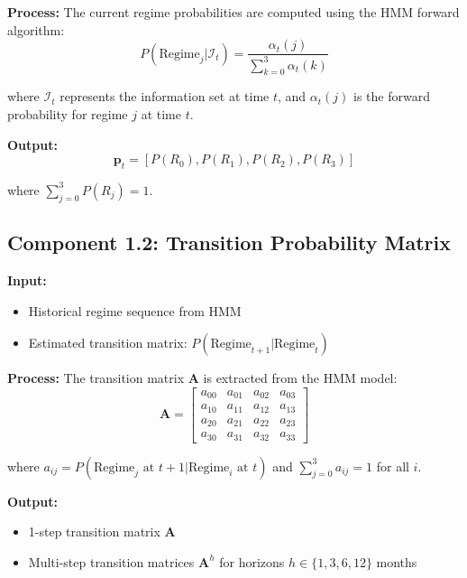 \documentclass[11pt,a4paper]{article}
\begin{document}
\textbf{Process:}
The current regime probabilities are computed using the HMM forward algorithm:
\begin{equation}
    P(\text{Regime}_j | \mathcal{I}_t) = \frac{\alpha_t(j)}{\sum_{k=0}^{3} \alpha_t(k)}
\end{equation}

where $\mathcal{I}_t$ represents the information set at time $t$, and $\alpha_t(j)$ is the forward probability for regime $j$ at time $t$.

\textbf{Output:}
\begin{equation}
    \mathbf{p}_t = [P(R_0), P(R_1), P(R_2), P(R_3)]
\end{equation}

where $\sum_{j=0}^{3} P(R_j) = 1$.

\subsection{Component 1.2: Transition Probability Matrix}

\textbf{Input:}
\begin{itemize}
    \item Historical regime sequence from HMM
    \item Estimated transition matrix: $P(\text{Regime}_{t+1} | \text{Regime}_t)$
\end{itemize}

\textbf{Process:}
The transition matrix $\mathbf{A}$ is extracted from the HMM model:
\begin{equation}
    \mathbf{A} = \begin{bmatrix}
        a_{00} & a_{01} & a_{02} & a_{03} \\
        a_{10} & a_{11} & a_{12} & a_{13} \\
        a_{20} & a_{21} & a_{22} & a_{23} \\
        a_{30} & a_{31} & a_{32} & a_{33}
    \end{bmatrix}
\end{equation}

where $a_{ij} = P(\text{Regime}_j \text{ at } t+1 | \text{Regime}_i \text{ at } t)$ and $\sum_{j=0}^{3} a_{ij} = 1$ for all $i$.

\textbf{Output:}
\begin{itemize}
    \item 1-step transition matrix $\mathbf{A}$
    \item Multi-step transition matrices $\mathbf{A}^h$ for horizons $h \in \{1, 3, 6, 12\}$ months
\end{itemize}
\end{document}
